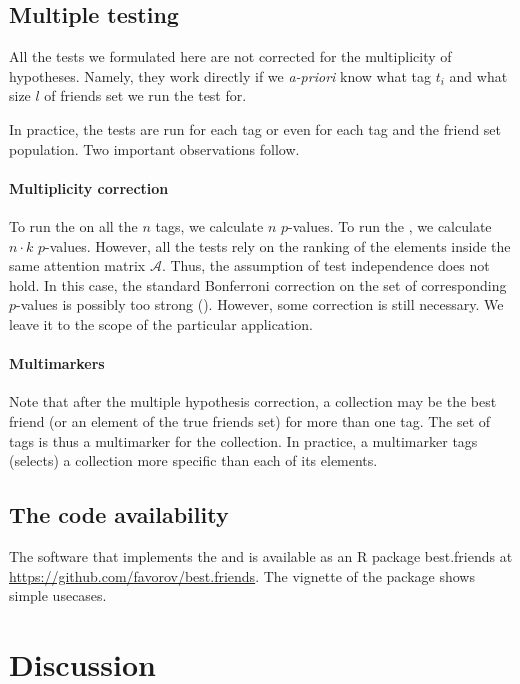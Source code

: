 \documentclass{llncs}
\begin{document}
\subsection{Multiple testing}
\label{sec:multimurkers}

All the tests we formulated here are not corrected for the multiplicity of hypotheses. Namely, they work directly if we \textit{a-priori} know what tag $t_i$ and what size $l$ of friends set we run the test for. 

In practice, the tests are run for each tag or even for each tag and the friend set population. Two important observations follow.

\paragraph*{Multiplicity correction} 
To run the  on all the $n$ tags, we 
calculate $n$ $p$-values. To run the , we calculate $n \cdot k$ $p$-values. However, all the tests rely on the ranking of the elements inside the same attention matrix $\mathcal{A}$. Thus, the assumption of test independence does not hold. In this case, the standard Bonferroni correction on the set of corresponding $p$-values is possibly too strong (\cite{cabin2000bonferroni}). However, some correction is still necessary. We leave it to the scope of the particular application.

\paragraph*{Multimarkers} Note that after the multiple hypothesis correction, a collection may be the best friend (or an element of the true friends set) for more than one tag. The set of tags is thus a multimarker for the collection. In practice, a multimarker tags (selects) a collection more specific than each of its elements.

\subsection{The code availability}

The software that implements the  and  is available as an \textsf{R} package \textsf{best.friends} at 
\url{https://github.com/favorov/best.friends}. The vignette of the package shows simple usecases. 

\section{Discussion}
\end{document}
